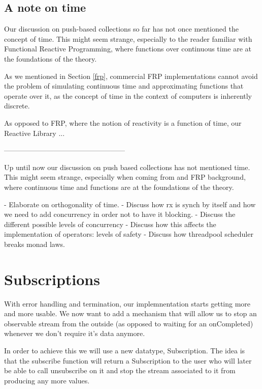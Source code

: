 \subsection{A note on time}

Our discussion on push-based collections so far has not once mentioned the concept of time. This might seem strange, especially to the reader familiar with Functional Reactive Programming, where functions over continuous time are at the foundations of the theory.

As we mentioned in Section \ref{frp}, commercial FRP implementations cannot avoid the problem of simulating continuous time and approximating functions that operate over it, as the concept of time in the context of computers is inherently discrete. 

As opposed to FRP, where the notion of reactivity is a function of time, our Reactive Library ...

---------------------------------------------------

Up until now our discussion on push based collections has not mentioned time. This might seem strange, especially when coming from and FRP background, where continuous time and functions are at the foundations of the theory. 

- Elaborate on orthogonality of time.
- Discuss how rx is synch by itself and how we need to add concurrency in order not to have it blocking. 
- Discuss the different possible levels of concurrency
- Discuss how this affects the implementation of operators: levels of safety
- Discuss how threadpool scheduler breaks monad laws. 

\section{Subscriptions}
\label{sec:subscriptions}

With error handling and termination, our implemnentation starts getting more and more usable. We now want to add a mechanism that will allow us to stop an observable stream from the outside (as opposed to waiting for an onCompleted) whenever we don't require it's data anymore. 

In order to achieve this we will use a new datatype, Subscription. The idea is that the subscribe function will return a Subscription to the user who will later be able to call unsubscribe on it and stop the stream associated to it from producing any more values.


